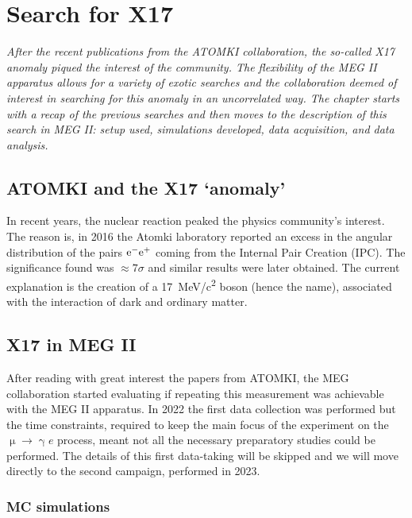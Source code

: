 \chapter{Search for X17}
\begin{refsection}
\label{ch:X17}
{\itshape After the recent publications from the ATOMKI collaboration, the so-called X17 anomaly piqued the interest of the community. The flexibility of the MEG II apparatus allows for a variety of exotic searches and the collaboration deemed of interest in searching for this anomaly in an uncorrelated way.
The chapter starts with a recap of the previous searches and then moves to the description of this search in MEG II: setup used, simulations developed, data acquisition, and data analysis.}

\section{ATOMKI and the X17 `anomaly'}
    In recent years, the nuclear reaction  peaked the physics community's interest.
    The reason is, in 2016 the Atomki laboratory reported an excess in the angular distribution of the pairs $\text{e}^- \text{e}^+$ coming from the Internal Pair Creation (IPC).
    The significance found was $\approx7\sigma$ and similar results were later obtained.
    The current explanation is the creation of a \SI{17}{MeV/c^2} boson (hence the name), associated with the interaction of dark and ordinary matter.

\section{X17 in MEG II}
    After reading with great interest the papers from ATOMKI, the MEG collaboration started evaluating if repeating this measurement was achievable with the MEG II apparatus.
    In 2022 the first data collection was performed but the time constraints, required to keep the main focus of the experiment on the $\upmu \rightarrow \upgamma e$ process, meant not all the necessary preparatory studies could be performed.
    The details of this first data-taking will be skipped and we will move directly to the second campaign, performed in 2023.
    
    \subsection{MC simulations}
    

\end{refsection}
